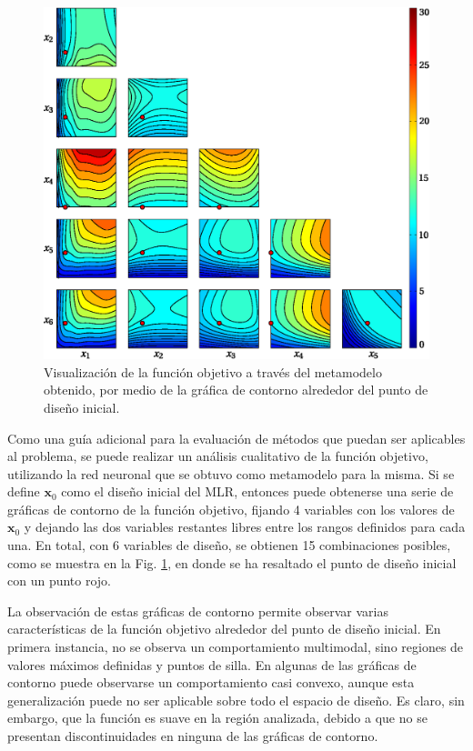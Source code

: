\begin{figure}[tb]
\centering
\includegraphics[scale=0.8]{../img/Optimizacion_del_Diseno/flandscape_labeled.eps}
\caption{Visualización de la función objetivo a través del metamodelo obtenido, por medio de la gráfica de contorno alrededor del punto de diseño inicial.}
\label{fig:flandscape}
\end{figure}
Como una guía adicional para la evaluación de métodos que puedan ser aplicables al problema, se puede realizar un análisis cualitativo de la función objetivo, utilizando la red neuronal que se obtuvo como metamodelo para la misma. Si se define $\mathbf{x}_0$ como el diseño inicial del MLR, entonces puede obtenerse una serie de gráficas de contorno de la función objetivo, fijando 4 variables con los valores de $\mathbf{x}_0$ y dejando las dos variables restantes libres entre los rangos definidos para cada una. En total, con 6 variables de diseño, se obtienen 15 combinaciones posibles, como se muestra en la Fig. \ref{fig:flandscape}, en donde se ha resaltado el punto de diseño inicial con un punto rojo.

La observación de estas gráficas de contorno permite observar varias características de la función objetivo alrededor del punto de diseño inicial. En primera instancia, no se observa un comportamiento multimodal, sino regiones de valores máximos definidas y puntos de silla. En algunas de las gráficas de contorno puede observarse un comportamiento casi convexo, aunque esta generalización puede no ser aplicable sobre todo el espacio de diseño. Es claro, sin embargo, que la función es suave en la región analizada, debido a que no se presentan discontinuidades en ninguna de las gráficas de contorno.

